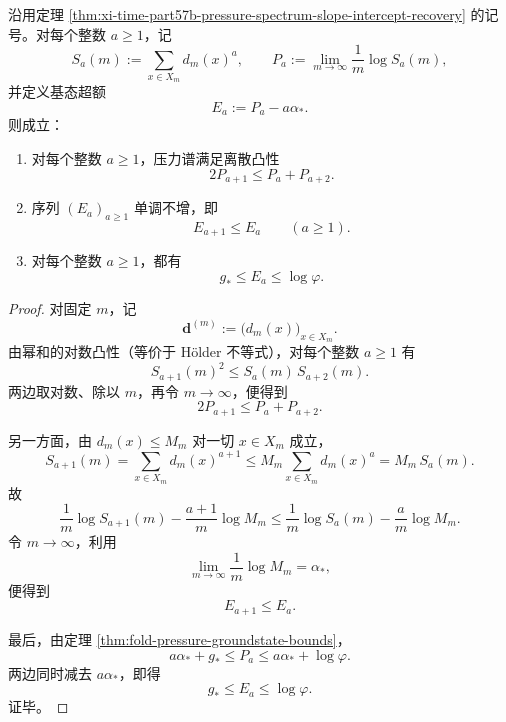 \begin{theorem}[纤维压力谱的离散凸性与基态超额的单调下降]\label{thm:xi-time-part57b-pressure-spectrum-discrete-convexity-monotone-excess}
沿用定理 \ref{thm:xi-time-part57b-pressure-spectrum-slope-intercept-recovery} 的记号。对每个整数 \(a\ge 1\)，记
\[
S_a(m):=\sum_{x\in X_m}d_m(x)^a,
\qquad
P_a:=\lim_{m\to\infty}\frac1m\log S_a(m),
\]
并定义基态超额
\[
E_a:=P_a-a\alpha_*.
\]
则成立：
\begin{enumerate}
  \item 对每个整数 \(a\ge 1\)，压力谱满足离散凸性
  \[
  \boxed{\;2P_{a+1}\le P_a+P_{a+2}.\;}
  \]
  \item 序列 \((E_a)_{a\ge 1}\) 单调不增，即
  \[
  \boxed{\;E_{a+1}\le E_a\qquad(a\ge 1).\;}
  \]
  \item 对每个整数 \(a\ge 1\)，都有
  \[
  \boxed{\;g_*\le E_a\le \log\varphi.\;}
  \]
\end{enumerate}
\end{theorem}
\begin{proof}
对固定 \(m\)，记
\[
\mathbf d^{(m)}:=\bigl(d_m(x)\bigr)_{x\in X_m}.
\]
由幂和的对数凸性（等价于 Hölder 不等式），对每个整数 \(a\ge 1\) 有
\[
S_{a+1}(m)^2\le S_a(m)\,S_{a+2}(m).
\]
两边取对数、除以 \(m\)，再令 \(m\to\infty\)，便得到
\[
2P_{a+1}\le P_a+P_{a+2}.
\]

另一方面，由 \(d_m(x)\le M_m\) 对一切 \(x\in X_m\) 成立，
\[
S_{a+1}(m)=\sum_{x\in X_m}d_m(x)^{a+1}
\le
M_m\sum_{x\in X_m}d_m(x)^a
=
M_m\,S_a(m).
\]
故
\[
\frac1m\log S_{a+1}(m)-\frac{a+1}{m}\log M_m
\le
\frac1m\log S_a(m)-\frac{a}{m}\log M_m.
\]
令 \(m\to\infty\)，利用
\[
\lim_{m\to\infty}\frac1m\log M_m=\alpha_*,
\]
便得到
\[
E_{a+1}\le E_a.
\]

最后，由定理 \ref{thm:fold-pressure-groundstate-bounds}，
\[
a\alpha_*+g_*\le P_a\le a\alpha_*+\log\varphi.
\]
两边同时减去 \(a\alpha_*\)，即得
\[
g_*\le E_a\le \log\varphi.
\]
证毕。
\end{proof}

